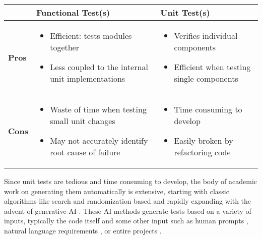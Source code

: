 \begin{tabular}{|>{\centering\arraybackslash}m{0.6cm}|>{\centering\arraybackslash}m{3.4cm}|>{\centering\arraybackslash}m{3.4cm}|}
    \hline
    \multirow{2}{*}{} & \textbf{Functional Test(s)} & \textbf{Unit Test(s)} \\
    \hline
    \textbf{Pros} & \begin{itemize}[leftmargin=*]
    \item Efficient: tests modules together
    \item Less coupled to the internal unit implementations
    \end{itemize} & \begin{itemize}[leftmargin=*]
        \item Verifies individual components
        \item Efficient when testing single components
    \end{itemize} \\
    \hline
    \textbf{Cons} & \begin{itemize}[leftmargin=*]
        \item Waste of time when testing small unit changes
        \item May not accurately identify root cause of failure
    \end{itemize} & \begin{itemize}[leftmargin=*]
        \item Time consuming to develop
        \item Easily broken by refactoring code
    \end{itemize} \\
    \hline
\end{tabular}
%

Since unit tests are tedious and time consuming to develop, the body of academic
work on generating them automatically is extensive, starting with classic
algorithms like search and randomization based \cite{Luk22Pynguin0170} and
rapidly expanding with the advent of generative AI 
\cite{bhatia2023unit,takerngsaksiri2024tdd,wang2024software}.
%
These AI methods generate tests based on a variety of inputs, typically the code
itself and some other input such as human prompts 
\cite{lahiri2023interactivecodegenerationtestdriven},
natural language requirements \cite{wang2024software}, or entire projects
\cite{rao2023cat}.

